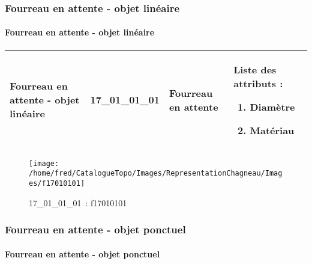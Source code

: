 \documentclass[12pt,titlepage]{book}
\begin{document}
\subsubsection{\large Fourreau en attente - objet linéaire}
\paragraph{Fourreau en attente - objet linéaire}
\noindent
\vspace{\baselineskip}

\renewcommand{\arraystretch}{1.2}
\begin{supertabular}{|p{10cm}|c|p{13cm}|p{12cm}|}
 Fourreau en attente - objet linéaire & 17\_01\_01\_01 & Fourreau en attente & Liste des attributs :
\begin{enumerate}
  \item Diamètre  \item Matériau\end{enumerate}
\\
\hline
\end{supertabular}
\begin{figure}[h!]
  \hfill         %
  \begin{minipage}[t]{3cm}
    \begin{center}
      \texttt{[image: /home/fred/CatalogueTopo/Images/RepresentationChagneau/Images/f17010101]}
      \caption[~17\_01\_01\_01]{\small{17\_01\_01\_01~:} \tiny{f17010101}}\label{f17010101}
    \end{center}
  \end{minipage}
\end{figure}

\subsubsection{\large Fourreau en attente - objet ponctuel}
\paragraph{Fourreau en attente - objet ponctuel}
\noindent
\vspace{\baselineskip}
\end{document}

